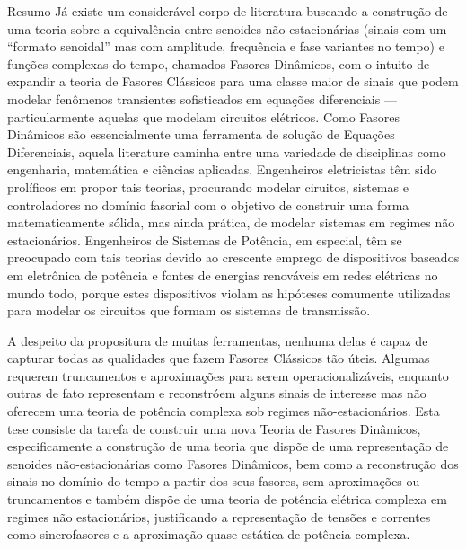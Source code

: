 \documentclass{apaThesis}
\begin{document}
\begin{newabstract}{Resumo}
	Já existe um considerável corpo de literatura buscando a construção de uma teoria sobre a equivalência entre senoides não estacionárias (sinais com um ``formato senoidal'' mas com amplitude, frequência e fase variantes no tempo) e funções complexas do tempo, chamados Fasores Dinâmicos, com o intuito de expandir a teoria de Fasores Clássicos para uma classe maior de sinais que podem modelar fenômenos transientes sofisticados em equações diferenciais — particularmente aquelas que modelam circuitos elétricos. Como Fasores Dinâmicos são essencialmente uma ferramenta de solução de Equações Diferenciais, aquela literature caminha entre uma variedade de disciplinas como engenharia, matemática e ciências aplicadas. Engenheiros eletricistas têm sido prolíficos em propor tais teorias, procurando modelar ciruitos, sistemas e controladores no domínio fasorial com o objetivo de construir uma forma matematicamente sólida, mas ainda prática, de modelar sistemas em regimes não estacionários. Engenheiros de Sistemas de Potência, em especial, têm se preocupado com tais teorias devido ao crescente emprego de dispositivos baseados em eletrônica de potência e fontes de energias renováveis em redes elétricas no mundo todo, porque estes dispositivos violam as hipóteses comumente utilizadas para modelar os circuitos que formam os sistemas de transmissão.

	A despeito da propositura de muitas ferramentas, nenhuma delas é capaz de capturar todas as qualidades que fazem Fasores Clássicos tão úteis. Algumas requerem truncamentos e aproximações para serem operacionalizáveis, enquanto outras de fato representam e reconstróem alguns sinais de interesse mas não oferecem uma teoria de potência complexa sob regimes não-estacionários. Esta tese consiste da tarefa de construir uma nova Teoria de Fasores Dinâmicos, especificamente a construção de uma teoria que dispõe de uma representação de senoides não-estacionárias como Fasores Dinâmicos, bem como a reconstrução dos sinais no domínio do tempo a partir dos seus fasores, sem aproximações ou truncamentos e também dispõe de uma teoria de potência elétrica complexa em regimes não estacionários, justificando a representação de tensões e correntes como sincrofasores e a aproximação quase-estática de potência complexa.


\end{newabstract}
\end{document}
